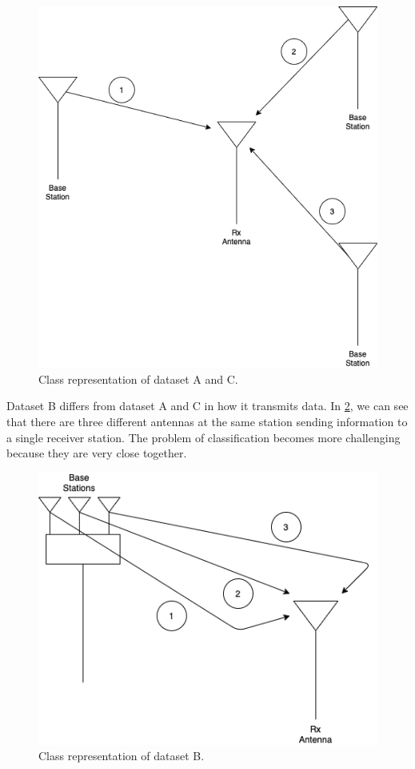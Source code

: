 \documentclass{turabian-thesis}[12pt]
\begin{document}
\begin{figure}[h!]
   \begin{center}
      \includegraphics[scale=0.4]{../media/dataset_ac.png}
   \end{center}
   \caption{Class representation of dataset A and C.}
   \label{fig:dataset_ac}
\end{figure}

Dataset B differs from dataset A and C in how it transmits data. In \ref{fig:dataset_b}, we can see that there are three different antennas at the same station sending information to a single receiver station. The problem of classification becomes more challenging because they are very close together.

\begin{figure}[h!]
   \begin{center}
      \includegraphics[scale=0.5]{../media/dataset_b.png}
   \end{center}
   \caption{Class representation of dataset B.}
   \label{fig:dataset_b}
\end{figure}
\end{document}
